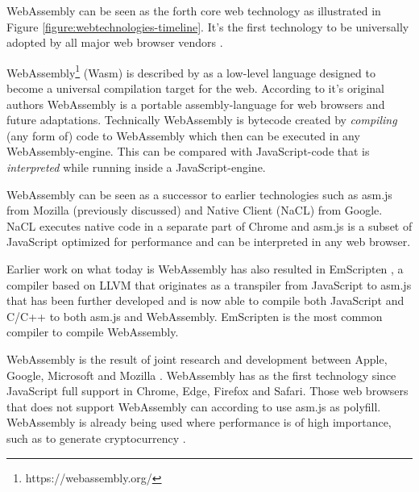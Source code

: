 
WebAssembly can be seen as the forth core web technology as illustrated in Figure \ref{figure:webtechnologies-timeline}. It's the first technology to be universally adopted by all major web browser vendors \parencite{HaasRossbergSchuffTitzerHolmanGohmanWagnerZakaiBastien2017}.

WebAssembly\footnote{https://webassembly.org/} (Wasm) is described by \textcite{Watt2018} as a low-level language designed to become a universal compilation target for the web. According to it's original authors \textcite{HaasRossbergSchuffTitzerHolmanGohmanWagnerZakaiBastien2017} WebAssembly is a portable assembly-language for web browsers and future adaptations. Technically WebAssembly is bytecode created by \emph{compiling} (any form of) code to WebAssembly \parencite{Watt2018} which then can be executed in any WebAssembly-engine. This can be compared with JavaScript-code that is \emph{interpreted} while running inside a JavaScript-engine.

WebAssembly can be seen as a successor to earlier technologies such as asm.js from Mozilla (previously discussed) and Native Client (NaCL) from Google. NaCL executes native code in a separate part of Chrome and asm.js  \parencite{Zakai2018} is a subset of JavaScript optimized for performance \parencite{VanEsNicolayStievenartDHondtDeRoover2016} and can be interpreted in any web browser.

Earlier work on what today is WebAssembly has also resulted in EmScripten \parencite{Zakai2011}, a compiler based on LLVM \parencite{LattnerAdve2014} that originates as a transpiler from JavaScript to asm.js \parencite{Zakai2011} that has been further developed \parencite{HaasRossbergSchuffTitzerHolmanGohmanWagnerZakaiBastien2017} and is now able to compile both JavaScript and C/C++ to both asm.js and WebAssembly. EmScripten is the most common compiler to compile WebAssembly.

WebAssembly is the result of joint research and development between Apple, Google, Microsoft and Mozilla \parencite{HaasRossbergSchuffTitzerHolmanGohmanWagnerZakaiBastien2017}. WebAssembly has as the first technology since JavaScript full support in Chrome, Edge, Firefox and Safari. Those web browsers that does not support WebAssembly can according to \textcite{HaasRossbergSchuffTitzerHolmanGohmanWagnerZakaiBastien2017} use asm.js as polyfill. WebAssembly is already being used where performance is of high importance, such as to generate cryptocurrency \parencite{RuthZimmermannWolsingHohlfeld2018}.

